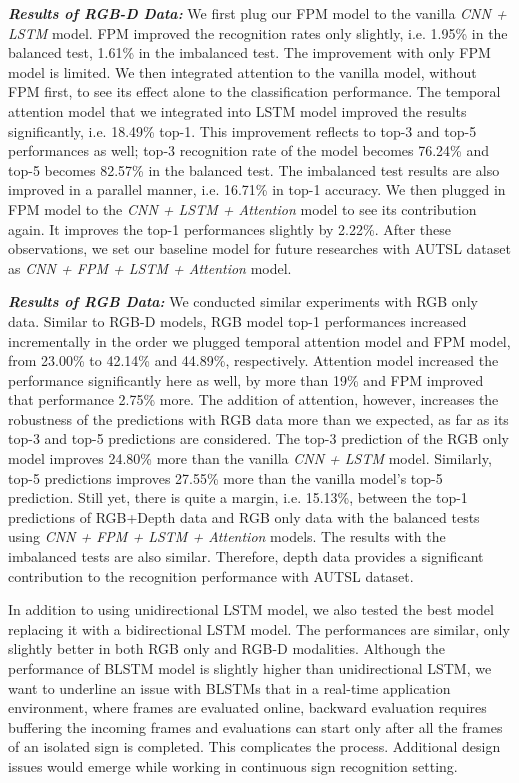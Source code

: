 \documentclass[11pt, a4paper, singlecolumn]{article}
\begin{document}
\textit{\textbf{Results of RGB-D Data:}} We first plug our FPM model to the vanilla \textit{CNN + LSTM} model. FPM improved the recognition rates only slightly, i.e. 1.95\% in the balanced test, 1.61\% in the imbalanced test. The improvement with only FPM model is limited. We then integrated attention to the vanilla model, without FPM first, to see its effect alone to the classification performance. The temporal attention model that we integrated into LSTM model improved the results significantly, i.e. 18.49\% top-1. This improvement reflects to top-3 and top-5 performances as well; top-3 recognition rate of the model becomes 76.24\% and top-5 becomes 82.57\% in the balanced test. The imbalanced test results are also improved in a parallel manner, i.e. 16.71\% in top-1 accuracy. We then plugged in FPM model to the \textit{CNN + LSTM + Attention} model to see its contribution again. It improves the top-1 performances slightly by 2.22\%. After these observations, we set our baseline model for future researches with AUTSL dataset as \textit{CNN + FPM + LSTM + Attention} model. 

\textit{\textbf{Results of RGB Data:}} We conducted similar experiments with RGB only data. Similar to RGB-D models, RGB model top-1 performances increased incrementally in the order we plugged temporal attention model and FPM model, from 23.00\% to 42.14\% and 44.89\%, respectively. Attention model increased the performance significantly here as well, by more than 19\% and FPM improved that performance 2.75\% more. The addition of attention, however, increases the robustness of the predictions with RGB data more than we expected, as far as its top-3 and top-5 predictions are considered. The top-3 prediction of the RGB only model improves 24.80\% more than the vanilla \textit{CNN + LSTM} model. Similarly, top-5 predictions improves 27.55\% more than the vanilla model's top-5 prediction. Still yet, there is quite a margin, i.e. 15.13\%, between the top-1 predictions of RGB+Depth data and RGB only data with the balanced tests using \textit{CNN + FPM + LSTM + Attention} models. The results with the imbalanced tests are also similar. Therefore, depth data provides a significant contribution to the recognition performance with AUTSL dataset.

In addition to using unidirectional LSTM model, we also tested the best model replacing it with a bidirectional LSTM model. The performances are similar, only slightly better in both RGB only and RGB-D modalities. Although the performance of BLSTM model is slightly higher than unidirectional LSTM, we want to underline an issue with BLSTMs that in a real-time application environment, where frames are evaluated online, backward evaluation requires buffering the incoming frames and evaluations can start only after all the frames of an isolated sign is completed. This complicates the process. Additional design issues would emerge while working in continuous sign recognition setting. 
\end{document}
